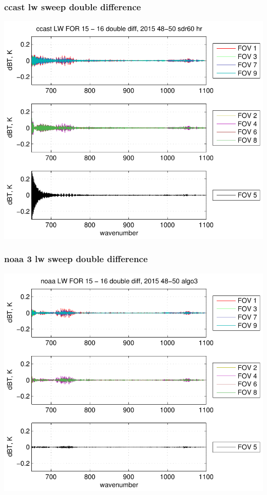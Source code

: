 \documentclass[11pt]{beamer}
\begin{document}
\begin{frame}
\frametitle{ccast lw sweep double difference}
\begin{center}
  \includegraphics[scale=0.7]{figures/ccast_LW_sfil_2015_48-50_sdr60_hr.pdf}
\end{center}
\end{frame}
\begin{frame}
\frametitle{noaa 3 lw sweep double difference}
\begin{center}
  \includegraphics[scale=0.7]{figures/noaa_LW_sfil_2015_48-50_algo3.pdf}
\end{center}
\end{frame}
\end{document}
